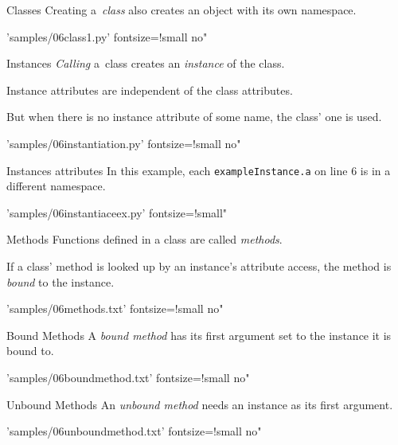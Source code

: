 \documentclass{pyslides}
\begin{document}
\begin{frame}[fragile]{Classes}
Creating a~\emph{class} also creates an object with its own namespace.

\bigskip

 'samples/06class1.py' fontsize=!small no"

\end{frame}

\begin{frame}[fragile]{Instances}
\emph{Calling} a~class creates an \emph{instance} of the class.

Instance attributes are independent of the class attributes.

But when there is no instance attribute of some name, the class' one is used.

\bigskip

 'samples/06instantiation.py' fontsize=!small no"

\end{frame}

\begin{frame}[fragile]{Instances attributes}
In this example, each {\tt exampleInstance.a} on line 6 is in a different namespace.

\bigskip

 'samples/06instantiaceex.py' fontsize=!small"

\end{frame}


\begin{frame}[fragile]{Methods}
Functions defined in a class are called \emph{methods}.

If a class' method is looked up by an instance's attribute access, the method is \emph{bound} to the instance.

 'samples/06methods.txt' fontsize=!small no"

\end{frame}

\begin{frame}[fragile]{Bound Methods}
A \emph{bound method} has its first argument set to the instance it is bound to.

 'samples/06boundmethod.txt' fontsize=!small no"

\end{frame}

\begin{frame}[fragile]{Unbound Methods}
An \emph{unbound method} needs an instance as its first argument.

 'samples/06unboundmethod.txt' fontsize=!small no"

\end{frame}
\end{document}
